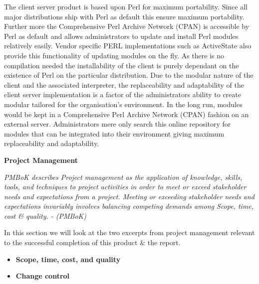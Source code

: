 	\normalsize
	{
		The client server product is based upon Perl for maximum portability.  Since all major distributions ship with Perl as default 
		this ensure maximum portability.  Further more the Comprehensive Perl Archive Network (CPAN) is accessible by Perl as default 
		and allows administrators to update and install Perl modules relatively easily.  
		\newline
		\newline
		Vendor specific PERL implementations such as ActiveState also provide this functionality of updating modules 
		on the fly.  As there is no compilation needed the installability of the 
		client is purely dependant on the existence of Perl on the particular distribution.
		\newline
		\newline
		Due to the modular nature of the client and the associated interpreter, the replaceability and adaptability of the client server
		implementation is a factor of the administrators ability to create modular tailored for the organisation's environment.
		\newline
		\newline
		In the long run, modules would be kept in a Comprehensive Perl Archive Network (CPAN) fashion on an external server.
		Administrators mere only search this online repository for modules that can be integrated into their environment giving maximum 
		replaceability and adaptability.
		\newline					
	}
	
	\large{\bfseries{Project Management}}
	\vspace{2mm}
	
	\normalsize{\textit
	{
		PMBoK describes Project management as the application of knowledge, skills, tools, and techniques
		to project activities in order to meet or exceed stakeholder needs and expectations from a project. 
		\newline
		\newline
		Meeting or exceeding stakeholder needs and expectations invariably involves balancing competing demands among Scope, time, cost \& quality. - (PMBoK)
		\newline
	}}
				
	\normalsize
	{
		In this section we will look at the two excerpts from project management relevant to the successful completion of this product \& the report.
		\begin{itemize}				
			\item \textbf{Scope, time, cost, and quality}
			\item \textbf{Change control}
		\end{itemize}	
		\vspace{3mm}
	}
		
